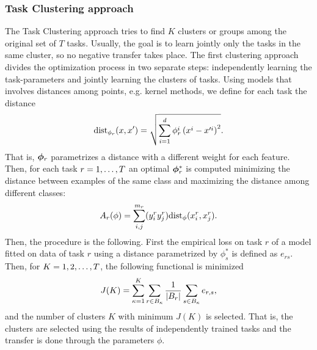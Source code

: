 \subsubsection*{Task Clustering approach}
The Task Clustering approach tries to find $K$ clusters or groups among the original set of $T$ tasks. Usually, the goal is to learn jointly only the tasks in the same cluster, so no negative transfer takes place.
The first clustering approach~\cite{ThrunO96} divides the optimization process in two separate steps: independently learning the task-parameters and jointly learning the clusters of tasks.
Using models that involves distances among points, e.g. kernel methods, we define for each task the distance
$$ \text{dist}_{\phi_r}(x, x') = \sqrt{\sum_{i=1}^d \phi_r^i \left( x^i - x'^i \right)^2}. $$
That is, $\bm{\phi}_r$ parametrizes a distance with a different weight for each feature.
Then, for each task $r=1, \ldots, T$ an optimal $\bm{\phi}_r^*$ is computed minimizing the distance between examples of the same class and maximizing the distance among different classes:
\begin{equation}
    \nonumber
    A_r(\phi) = \sum_{i, j}^{m_r} (y_i^r  y_j^r) \text{dist}_\phi(x_i^r, x_j^r).
\end{equation}
Then, the procedure is the following. First the empirical loss on task $r$ of a model fitted on data of task $r$ using a distance parametrized by $\phi_s^*$ is defined as $e_{rs}$. Then, for $K = 1, 2,  \ldots, T$, the following functional is minimized
\begin{equation}
    \nonumber
    J(K) = \sum_{\kappa = 1}^K \sum_{r \in B_\kappa} \frac{1}{\left|B_r\right|} \sum_{s \in B_\kappa} e_{r, s} ,
\end{equation}
and the number of clusters $K$ with minimum $J(K)$ is selected. That is, the clusters are selected using the results of independently trained tasks and the transfer is done through the parameters $\phi$.
%

